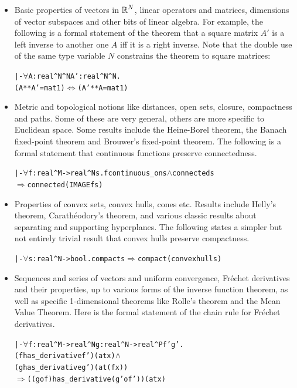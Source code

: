 \documentclass[11pt]{amsart}
\def\sz{small} %
\newcommand{\real}{\mbox{$\protect\mathbb R$}}
\let\And=\wedge                    %
\newcommand{\Imp}{\Rightarrow}
\newcommand{\Iff}{\Leftrightarrow}
\begin{document}
\begin{itemize}

\item Basic properties of vectors in $\real^N$, linear operators and matrices,
dimensions of vector subspaces and other bits of linear algebra. For example,
the following is a formal statement of the theorem that a square matrix $A'$ is
a left inverse to another one $A$ iff it is a right inverse. Note that the
double use of the same type variable $N$ constrains the theorem to square
matrices:

\begin{\sz}
\begin{alltt}
|- \(\forall\)A:real^N^N A':real^N^N. 
         (A ** A' = mat 1) \(\Iff\) (A' ** A = mat 1)
\end{alltt}
\end{\sz}

\item Metric and topological notions like distances, open sets, closure,
compactness and paths. Some of these are very general, others are more specific
to Euclidean space. Some results include the Heine-Borel theorem, the Banach
fixed-point theorem and Brouwer's fixed-point theorem. The following is a
formal statement that continuous functions preserve connectedness.

\begin{\sz}
\begin{alltt}
|-  \(\forall\)f:real^M->real^N s. f continuous_on s \(\And\) connected s 
         \(\Imp\) connected(IMAGE f s)
\end{alltt}
\end{\sz}

\item Properties of convex sets, convex hulls, cones etc. Results include
Helly's theorem, Carath\'eodory's theorem, and various classic results about
separating and supporting hyperplanes. The following states a simpler but not
entirely trivial result that convex hulls preserve compactness.

\begin{\sz}
\begin{alltt}
|- \(\forall\)s:real^N->bool. compact s \(\Imp\) compact(convex hull s)
\end{alltt}
\end{\sz}

\item Sequences and series of vectors and uniform convergence, Fr\'echet
derivatives and their properties, up to various forms of the inverse function
theorem, as well as specific 1-dimensional theorems like Rolle's theorem and
the Mean Value Theorem. Here is the formal statement of the chain rule for
Fr\'echet derivatives.

\begin{\sz}
\begin{alltt}
|- \(\forall\)f:real^M->real^N g:real^N->real^P f' g'.
        (f has_derivative f') (at x) \(\And\)
        (g has_derivative g') (at (f x))
        \(\Imp\) ((g o f) has_derivative (g' o f')) (at x)
\end{alltt}
\end{\sz}

\end{itemize}
\end{document}
